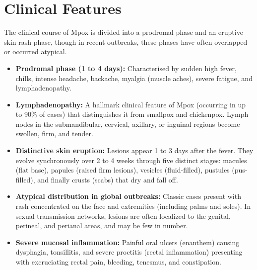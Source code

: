 \section*{Clinical Features}
The clinical course of Mpox is divided into a prodromal phase and an eruptive skin rash phase, though in recent outbreaks, these phases have often overlapped or occurred atypical.
\begin{itemize}
    \item \textbf{Prodromal phase (1 to 4 days):} Characterised by sudden high fever, chills, intense headache, backache, myalgia (muscle aches), severe fatigue, and lymphadenopathy.
    \item \textbf{Lymphadenopathy:} A hallmark clinical feature of Mpox (occurring in up to 90\% of cases) that distinguishes it from smallpox and chickenpox. Lymph nodes in the submandibular, cervical, axillary, or inguinal regions become swollen, firm, and tender.
    \item \textbf{Distinctive skin eruption:} Lesions appear 1 to 3 days after the fever. They evolve synchronously over 2 to 4 weeks through five distinct stages: macules (flat base), papules (raised firm lesions), vesicles (fluid-filled), pustules (pus-filled), and finally crusts (scabs) that dry and fall off.
    \item \textbf{Atypical distribution in global outbreaks:} Classic cases present with rash concentrated on the face and extremities (including palms and soles). In sexual transmission networks, lesions are often localized to the genital, perineal, and perianal areas, and may be few in number.
    \item \textbf{Severe mucosal inflammation:} Painful oral ulcers (enanthem) causing dysphagia, tonsillitis, and severe proctitis (rectal inflammation) presenting with excruciating rectal pain, bleeding, tenesmus, and constipation.
\end{itemize}

